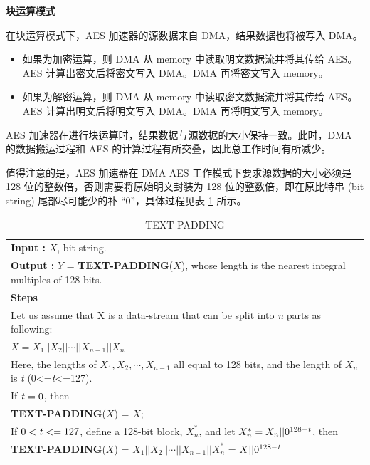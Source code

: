 \documentclass[main\_\_CN.tex]{subfiles}
\begin{document}
\textbf{块运算模式}

在块运算模式下，AES 加速器的源数据来自 DMA，结果数据也将被写入 DMA。
\begin{itemize}
    \item 如果为加密运算，则 DMA 从 memory 中读取明文数据流并将其传给 AES。AES 计算出密文后将密文写入 DMA。DMA 再将密文写入 memory。
    \item 如果为解密运算，则 DMA 从 memory 中读取密文数据流并将其传给 AES。AES 计算出明文后将明文写入 DMA。DMA 再将明文写入 memory。
\end{itemize}

AES 加速器在进行块运算时，结果数据与源数据的大小保持一致。此时，DMA 的数据搬运过程和 AES 的计算过程有所交叠，因此总工作时间有所减少。

\label{api:testpadding}值得注意的是，AES 加速器在 DMA-AES 工作模式下要求源数据的大小必须是 128 位的整数倍，否则需要将原始明文封装为 128 位的整数倍，即在原比特串 (bit string) 尾部尽可能少的补 “0”，具体过程见表 \ref{tab:aes-define-func-text-padding} 所示。

\clearpage
\begin{longtable}[c]{|p{15cm}|}
\caption{TEXT-PADDING} 
\label{tab:aes-define-func-text-padding}\\
\hline
\rowcolor{lightgray}
\multirow{1}{*}{%
{\bfseries Function :} {\bfseries TEXT-PADDING}(\ ) } \\\hline
{\bfseries Input\phantom{aaa} :} $X$, bit string.\\
{\bfseries Output\phantom{a~} :} $Y$ = {\bfseries TEXT-PADDING}($X$), whose length is the nearest integral multiples of 128 bits. \\\hline
{\bfseries Steps\phantom{aa~}  }\\
\hspace{1.3cm} Let us assume that X is a data-stream that can be split into {\it{n}} parts as following: \\
\phantom{aaaaaaaa}$X = X_{1} || X_{2} || \cdots || X_{n-1} || X_{n}$ \\ 
\phantom{aaaaaaaa}Here, the lengths of $X_{1}, X_{2}, \cdots, X_{n-1}$ all equal to 128 bits, and the length of $X_{n}$ is {\it{t}} (0<={\it{t}}<=127).\\
\phantom{aaaaaaaa}If ${\it{t}} = 0$, then\\
\phantom{aaaaaaaa}\phantom{空空空空空} {\bfseries TEXT-PADDING}($X$) = $X$;\\
\phantom{aaaaaaaa}If $0<{\it{t}} <= 127$, define a 128-bit block, $X_{n}^{*}$, and let $X_{n}^{*} = X_{n} || 0^{128-{\it{t}}}$, then\\
\phantom{aaaaaaaa}\phantom{空空空空空} {\bfseries TEXT-PADDING}($X$) = $X_{1} || X_{2} || \cdots || X_{n-1} || X_{n}^{*}$  = $X || 0^{128-{\it{t}}}$\\
\hline
\end{longtable}
\end{document}
